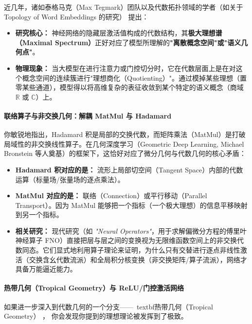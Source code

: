 \documentclass[10pt,a4paper]{article}
\begin{document}
近几年，诸如泰格马克（Max Tegmark）团队以及代数拓扑领域的学者（如关于 Topology of Word Embeddings 的研究）\cite{Mikolov2013WordEmbeddings} 提出：

\begin{itemize}
\item \textbf{研究核心：} 神经网络的隐藏层激活值构成的代数结构，其\textbf{极大理想谱（Maximal Spectrum）}正好对应了模型所理解的\textbf{"离散概念空间"或"语义几何点"}。
\item \textbf{物理现象：} 当大模型在进行注意力或门控切分时，它在代数层面上是在对这个概念空间的连续簇进行"理想商化（Quotienting）"。通过模掉某些理想（置零某些通道），模型得以将高维复杂的表征收敛到某个特定的语义概念（商域 $\mathbb{R}$ 或 $\mathbb{C}$）上。
\end{itemize}

\paragraph{联络算子与非交换几何：解耦 MatMul 与 Hadamard}

你敏锐地指出，Hadamard 积是局部的交换代数，而矩阵乘法（MatMul）是打破局域性的非交换线性算子。在几何深度学习（Geometric Deep Learning, Michael Bronstein 等人奠基）\cite{Bronstein2021Geometric}的框架下，这恰好对应了微分几何与代数几何的核心矛盾：

\begin{itemize}
\item \textbf{Hadamard 积对应的是：} 流形上局部切空间（Tangent Space）内部的代数运算（标量场/张量场的逐点乘法）。
\item \textbf{MatMul 对应的是：} 联络（Connection）或平行移动（Parallel Transport）。因为 MatMul 能够把一个指标（一个极大理想）的信息平移映射到另一个指标。
\item \textbf{相关研究：} 现代研究（如 \textit{"Neural Operators"}，用于求解偏微分方程的傅里叶神经算子 FNO）\cite{Li2021FNO}直接把层与层之间的变换视为无限维函数空间上的非交换代数同态。它们显式地利用算子理论来证明，为什么只有交替进行逐点非线性激活（交换含幺代数流派）和全局积分核变换（非交换矩阵/算子流派），网络才具备万能逼近能力。
\end{itemize}

\paragraph{热带几何（Tropical Geometry）与 ReLU/门控激活网络}

如果进一步深入到代数几何的一个分支——\
textbf{热带几何（Tropical Geometry）}
\cite{Zhang2018Tropical}，
你会发现你提到的理想理论被发挥到了极致。
\end{document}
